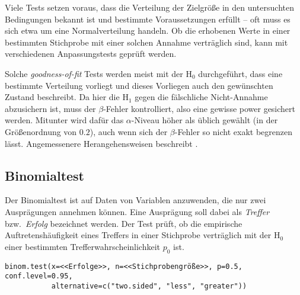 Viele Tests setzen voraus, dass die Verteilung der Zielgröße in den untersuchten Bedingungen bekannt ist und bestimmte Voraussetzungen erfüllt -- oft muss es sich etwa um eine Normalverteilung handeln. Ob die erhobenen Werte in einer bestimmten Stichprobe mit einer solchen Annahme verträglich sind, kann mit verschiedenen Anpassungstests geprüft werden.

Solche \emph{goodness-of-fit} Tests werden meist mit der $\text{H}_{0}$ durchgeführt, dass eine bestimmte Verteilung vorliegt und dieses Vorliegen auch den gewünschten Zustand beschreibt. Da hier die $\text{H}_{1}$ gegen die fälschliche Nicht-Annahme abzusichern ist, muss der $\beta$-Fehler kontrolliert, also eine gewisse power gesichert werden. Mitunter wird dafür das $\alpha$-Niveau höher als üblich gewählt (in der Größenordnung von $0.2$), auch wenn sich der $\beta$-Fehler so nicht exakt begrenzen lässt. Angemessenere Herangehensweisen beschreibt .

\subsection{Binomialtest}
\label{sec:binomTest}

Der Binomialtest ist auf Daten von Variablen anzuwenden, die nur zwei Ausprägungen annehmen können. Eine Ausprägung soll dabei als \emph{Treffer} bzw.\ \emph{Erfolg} bezeichnet werden. Der Test prüft, ob die empirische Auftretenshäufigkeit eines Treffers in einer Stichprobe verträglich mit der $\text{H}_{0}$ einer bestimmten Trefferwahrscheinlichkeit $p_{0}$ ist.
\begin{lstlisting}
binom.test(x=<<Erfolge>>, n=<<Stichprobengröße>>, p=0.5, conf.level=0.95,
           alternative=c("two.sided", "less", "greater"))
\end{lstlisting}

